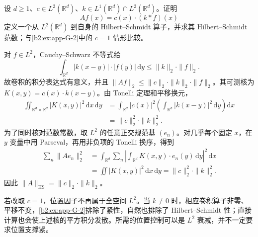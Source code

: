 \begin{exercise}\label{b2:ex:app-G-3}
设 \(d\ge1\)、\(c\in L^2(\mathbb R^d)\)、\(k\in L^1(\mathbb R^d)\cap L^2(\mathbb R^d)\)。证明
\[
 Af(x)=c(x)\cdot(k*f)(x)
\]
定义一个从 \(L^2(\mathbb R^d)\) 到自身的 Hilbert--Schmidt 算子，并求其 Hilbert--Schmidt 范数；与\cref{b2:ex:app-G-2}中的 \(c=1\) 情形比较。
\end{exercise}
\begin{solution}
对 \(f\in L^2\)，Cauchy--Schwarz 不等式给
\[
 \int_{\mathbb R^d}|k(x-y)|\cdot|f(y)|\,\mathrm dy
 \le\|k\|_2\cdot\|f\|_2.
\]
故卷积的积分表达式有意义，并且
\(\|Af\|_2\le\|c\|_2\cdot\|k\|_2\cdot\|f\|_2\)。其可测核为
\(K(x,y)=c(x)\cdot k(x-y)\)。由 Tonelli 定理和平移换元，
\[
 \begin{aligned}
 \iint_{\mathbb R^d\times\mathbb R^d}|K(x,y)|^2\,\mathrm dx\,\mathrm dy
 &=\int_{\mathbb R^d}|c(x)|^2
       \left(\int_{\mathbb R^d}|k(x-y)|^2\,\mathrm dy\right)\mathrm dx\\
 &=\|c\|_2^2\cdot\|k\|_2^2.
 \end{aligned}
\]
为了同时核对范数常数，取 \(L^2\) 的任意正交规范基 \((e_n)\)。对几乎每个固定 \(x\)，在 \(y\) 变量中用 Parseval，再用非负项的 Tonelli 换序，得到
\[
 \begin{aligned}
 \sum_n\|Ae_n\|_2^2
 &=\int_{\mathbb R^d}
       \sum_n\left|\int_{\mathbb R^d}K(x,y)\cdot e_n(y)\,\mathrm dy\right|^2
           \,\mathrm dx\\
 &=\iint|K(x,y)|^2\,\mathrm dx\,\mathrm dy
 =\|c\|_2^2\cdot\|k\|_2^2.
 \end{aligned}
\]
因此 \(\|A\|_{\mathrm{HS}}=\|c\|_2\cdot\|k\|_2\)。

若改取 \(c=1\)，位置因子不再属于全空间 \(L^2\)。当 \(k\ne0\) 时，相应卷积算子非零、平移不变，\cref{b2:ex:app-G-2}排除了紧性，自然也排除了 Hilbert--Schmidt 性；直接计算也会使上述核的平方积分发散。所需的位置控制可以是 \(L^2\) 衰减，并不一定要求位置支撑紧。
\end{solution}

